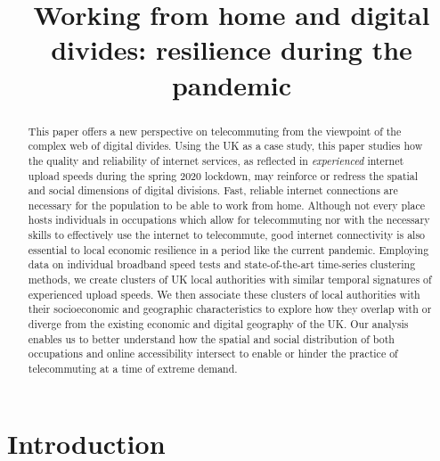 \documentclass[Royal,times,sageh]{sagej}
\begin{document}
\title{Working from home and digital divides: resilience during the pandemic}

\runninghead{}

\author{}

\affiliation{}



\begin{abstract}
This paper offers a new perspective on telecommuting from the viewpoint
of the complex web of digital divides. Using the UK as a case study,
this paper studies how the quality and reliability of internet services,
as reflected in \emph{experienced} internet upload speeds during the
spring 2020 lockdown, may reinforce or redress the spatial and social
dimensions of digital divisions. Fast, reliable internet connections are
necessary for the population to be able to work from home. Although not
every place hosts individuals in occupations which allow for
telecommuting nor with the necessary skills to effectively use the
internet to telecommute, good internet connectivity is also essential to
local economic resilience in a period like the current pandemic.
Employing data on individual broadband speed tests and state-of-the-art
time-series clustering methods, we create clusters of UK local
authorities with similar temporal signatures of experienced upload
speeds. We then associate these clusters of local authorities with their
socioeconomic and geographic characteristics to explore how they overlap
with or diverge from the existing economic and digital geography of the
UK. Our analysis enables us to better understand how the spatial and
social distribution of both occupations and online accessibility
intersect to enable or hinder the practice of telecommuting at a time of
extreme demand.
\end{abstract}


\maketitle

\hypertarget{sec:1}{%
\section{Introduction}\label{sec:1}}
\end{document}
